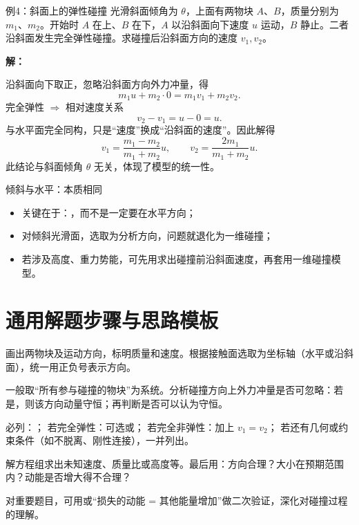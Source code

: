 \documentclass[a4paper,11pt]{ctexart}
\begin{document}
\begin{examplebox}{例4：斜面上的弹性碰撞}
光滑斜面倾角为 $\theta$，上面有两物块 $A$、$B$，质量分别为 $m_1$、$m_2$。开始时 $A$ 在上、$B$ 在下，$A$ 以沿斜面向下速度 $u$ 运动，$B$ 静止。二者沿斜面发生完全弹性碰撞。求碰撞后沿斜面方向的速度 $v_1,v_2$。

\textbf{解：}\par
沿斜面向下取正，忽略沿斜面方向外力冲量，得
\[
  m_1u + m_2\cdot 0 = m_1v_1 + m_2v_2.
\]
完全弹性 $\Rightarrow$ 相对速度关系
\[
  v_2 - v_1 = u - 0 = u.
\]
与水平面完全同构，只是“速度”换成“沿斜面的速度”。因此解得
\[
  v_1 = \dfrac{m_1 - m_2}{m_1 + m_2}u,\qquad
  v_2 = \dfrac{2m_1}{m_1 + m_2}u.
\]
此结论与斜面倾角 $\theta$ 无关，体现了模型的统一性。
\end{examplebox}

\begin{summarybox}{倾斜与水平：本质相同}
\begin{itemize}
  \item 关键在于：，而不是一定要在水平方向；
  \item 对倾斜光滑面，选取为分析方向，问题就退化为一维碰撞；
  \item 若涉及高度、重力势能，可先用求出碰撞前沿斜面速度，再套用一维碰撞模型。
\end{itemize}
\end{summarybox}

\section{通用解题步骤与思路模板}

\begin{roadmap}
  画出两物块及运动方向，标明质量和速度。根据接触面选取为坐标轴（水平或沿斜面），统一用正负号表示方向。

  一般取“所有参与碰撞的物块”为系统。分析碰撞方向上外力冲量是否可忽略：若是，则该方向动量守恒；再判断是否可以认为守恒。

  必列：；
  若完全弹性：可选或；
  若完全非弹性：加上 $v_1 = v_2$；
  若还有几何或约束条件（如不脱离、刚性连接），一并列出。

  解方程组求出未知速度、质量比或高度等。最后用：方向合理？大小在预期范围内？动能是否增大得不合理？

  对重要题目，可用或“损失的动能 = 其他能量增加”做二次验证，深化对碰撞过程的理解。
\end{roadmap}
\end{document}
